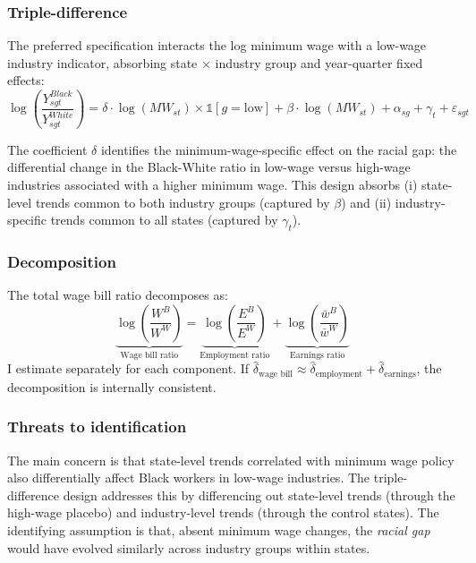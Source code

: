 \documentclass[12pt]{article}
\begin{document}
\subsubsection*{Triple-difference} The preferred specification interacts the log minimum wage with a low-wage industry indicator, absorbing state $\times$ industry group and year-quarter fixed effects:
\begin{equation}
\log\left(\frac{Y^{Black}_{sgt}}{Y^{White}_{sgt}}\right) = \delta \cdot \log(MW_{st}) \times \mathbb{1}[g = \text{low}] + \beta \cdot \log(MW_{st}) + \alpha_{sg} + \gamma_t + \varepsilon_{sgt}
\label{eq:ddd}
\end{equation}

The coefficient $\delta$ identifies the minimum-wage-specific effect on the racial gap: the differential change in the Black-White ratio in low-wage versus high-wage industries associated with a higher minimum wage. This design absorbs (i) state-level trends common to both industry groups (captured by $\beta$) and (ii) industry-specific trends common to all states (captured by $\gamma_t$).

\subsubsection*{Decomposition} The total wage bill ratio decomposes as:
\begin{equation}
\underbrace{\log\left(\frac{W^B}{W^W}\right)}_{\text{Wage bill ratio}} = \underbrace{\log\left(\frac{E^B}{E^W}\right)}_{\text{Employment ratio}} + \underbrace{\log\left(\frac{\bar{w}^B}{\bar{w}^W}\right)}_{\text{Earnings ratio}}
\end{equation}
I estimate  separately for each component. If $\hat{\delta}_{\text{wage bill}} \approx \hat{\delta}_{\text{employment}} + \hat{\delta}_{\text{earnings}}$, the decomposition is internally consistent.

\subsubsection*{Threats to identification} The main concern is that state-level trends correlated with minimum wage policy also differentially affect Black workers in low-wage industries. The triple-difference design addresses this by differencing out state-level trends (through the high-wage placebo) and industry-level trends (through the control states). The identifying assumption is that, absent minimum wage changes, the \textit{racial gap} would have evolved similarly across industry groups within states.
\end{document}
